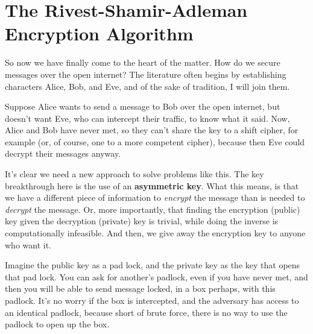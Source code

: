 \documentclass{article}
\begin{document}
	    \section{The Rivest-Shamir-Adleman Encryption Algorithm}
	        So now we have finally come to the heart of the matter.  How do we secure messages over the open internet?  The literature often begins by establishing characters Alice, Bob, and Eve, and of the sake of tradition, I will join them.
	        
	        Suppose Alice wants to send a message to Bob over the open internet, but doesn't want Eve, who can intercept their traffic, to know what it said.  Now, Alice and Bob have never met, so they can't share the key to a shift cipher, for example (or, of course, one to a more competent cipher), because then Eve could decrypt their messages anyway.
	        
	        It's clear we need a new approach to solve problems like this.  The key breakthrough here is the use of an \textbf{asymmetric key}.  
	        What this means, is that we have a different piece of information to \textit{encrypt} the message than is needed to \textit{decrypt} the message.  
	        Or, more importantly, that finding the encryption (public) key given the decryption (private) key is trivial, while doing the inverse is computationally infeasible.  
	        And then, we give away the encryption key to anyone who want it.
	        
	        Imagine the public key as a pad lock, and the private key as the key that opens that pad lock.  You can ask for another's padlock, even if you have never met, and then you will be able to send message locked, in a box perhaps, with this padlock.  It's no worry if the box is intercepted, and the adversary has access to an identical padlock, because short of brute force, there is no way to use the padlock to open up the box.
	        
	        
	        
	        
        
\end{document}
